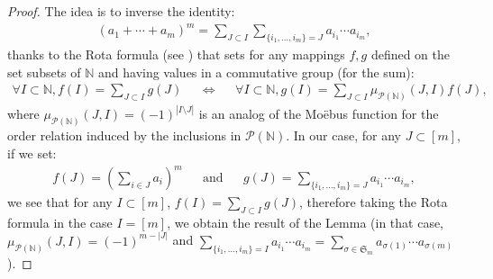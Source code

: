 \documentclass{ws-rmta}
\begin{document}
\begin{proof}
  The idea is to inverse the identity:
  \begin{align*}
    (a_1+\cdots+a_m)^m = \sum_{J\subset I} \sum_{ \{i_1,\ldots,i_m\} =  J}a_{i_1} \cdots a_{i_m},
  \end{align*}
  thanks to the Rota formula (see \cite{Rol06}) that sets for any mappings $f, g$ defined on the set subsets of $\mathbb N$ and having values in a commutative group (for the sum):
  \begin{align*}
    \forall I \subset \mathbb N, f(I) = \sum_{J\subset I} g(J)&
    &\Longleftrightarrow&
    & \forall I \subset \mathbb N, g(I) = \sum_{J\subset I}\mu_{\mathcal P(\mathbb N)}(J,I) f(J),
  \end{align*}
  where $\mu_{\mathcal P(\mathbb N)}(J,I)  =(-1)^{|I\setminus J|}$ is an analog of the Mo\"ebus function for the order relation induced by the inclusions in $\mathcal P(\mathbb N)$.
  In our case, for any $J \subset [m]$, if we set:
  \begin{align*}
    f(J) = \left(\sum_{i\in J} a_i \right)^m&
    &\text{and}&
    &g(J) = \sum_{ \{i_1,\ldots,i_m\} =  J}a_{i_1} \cdots a_{i_m},
  \end{align*}
  we see that for any $I \subset [m]$, $f(I) = \sum_{J\subset I} g(J)$, therefore taking the Rota formula in the case $I = [m]$, we obtain the result of the Lemma (in that case, $\mu_{\mathcal P(\mathbb N)}(J,I)= (-1)^{m-|J|}$ and $\sum_{ \{i_1,\ldots,i_m\} =  I}a_{i_1} \cdots a_{i_m} = \sum_{\sigma \in \mathfrak S_m} a_{\sigma(1)}\cdots a_{\sigma(m)}$).
\end{proof}
\end{document}
